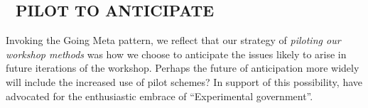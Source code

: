 \subsection*{💎 PILOT TO ANTICIPATE {\hfill \sensory}}

Invoking the {\sc Going Meta} pattern, we reflect that our strategy of
\emph{piloting our workshop methods} was how we choose to anticipate
the issues likely to arise in future iterations of the workshop.
Perhaps the future of anticipation more widely will include the
increased use of pilot schemes?  In support of this possibility, \citet{unger2019imagination} have advocated for the enthusiastic embrace of “Experimental government”.
